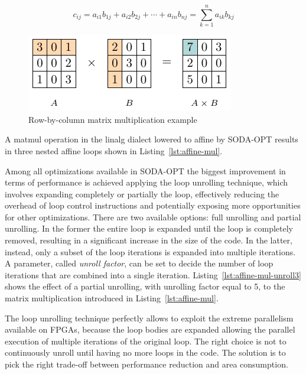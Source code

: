 \begin{equation}
    \label{eq:matmul-element}
    c_{ij}= a_{i1} b_{1j} + a_{i2} b_{2j} +\cdots+ a_{in} b_{nj} = \sum_{k=1}^n a_{ik}b_{kj}
\end{equation}

\begin{figure}[t!]
    \centering
    \includegraphics[height=0.24\textwidth]{Images/row-by-col-mult-example}
    \caption{Row-by-column matrix multiplication example}
    \label{fig:row-by-col-mul-example}
\end{figure}

A matmul operation in the linalg dialect lowered to affine by SODA-OPT results in three nested affine loops shown in Listing~\ref{lst:affine-mul}.

Among all optimizations available in SODA-OPT the biggest improvement in terms of performance is achieved applying the loop unrolling technique, which involves expanding completely or partially the loop, effectively reducing the overhead of loop control instructions and potentially exposing more opportunities for other optimizations.
There are two available options: full unrolling and partial unrolling.
In the former the entire loop is expanded until the loop is completely removed, resulting in a significant increase in the size of the code.
In the latter, instead, only a subset of the loop iterations is expanded into multiple iterations.
A parameter, called \textit{unroll factor}, can be set to decide the number of loop iterations that are combined into a single iteration.
Listing~\ref{lst:affine-mul-unroll3} shows the effect of a partial unrolling, with unrolling factor equal to 5, to the matrix multiplication introduced in Listing~\ref{lst:affine-mul}.

The loop unrolling technique perfectly allows to exploit the extreme parallelism available on FPGAs, because the loop bodies are expanded allowing the parallel execution of multiple iterations of the original loop.
The right choice is not to continuously unroll until having no more loops in the code.
The solution is to pick the right trade-off between performance reduction and area consumption.

